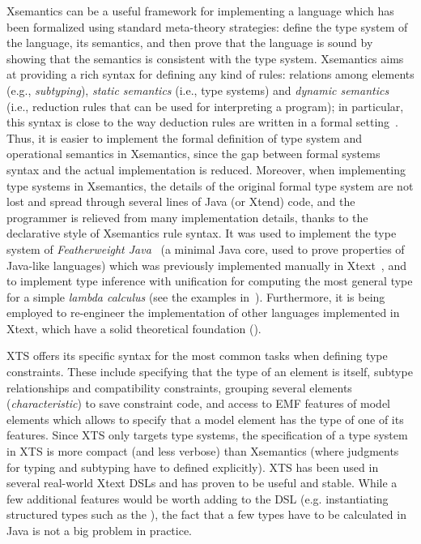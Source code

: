 Xsemantics can be a useful framework for implementing a language which has been
formalized using standard meta-theory strategies: define the type system of the
language, its semantics, and then prove that the language is sound by showing
that the semantics is consistent with the type system.
Xsemantics aims at providing a rich syntax for defining any kind of rules:
relations among elements (e.g., \emph{subtyping}), \emph{static semantics}
(i.e., type systems) and \emph{dynamic semantics} (i.e., reduction rules that
can be used for interpreting a program); in particular, this syntax is close to
the way deduction rules are written in a formal
setting~\cite{hindley:1997a,Pierce02}.  Thus, it is easier to implement the
formal definition of type system and operational semantics in Xsemantics, since
the gap between formal systems syntax and the actual implementation is reduced.
Moreover, when implementing type systems in Xsemantics, the details of the
original formal type system are not lost and spread through several lines of
Java (or Xtend) code, and the programmer is relieved from many implementation
details, thanks to the declarative style of Xsemantics rule syntax. It was used
to implement the type system of \emph{Featherweight
Java}~\cite{IgarashiPierceWadler:TOPLAS-2001} (a minimal Java core, used to
prove properties of Java-like languages) which was previously implemented
manually in Xtext~\cite{Bet10}, and to implement type inference with unification
for computing the most general type for a simple \emph{lambda calculus} (see the
examples in~\cite{lbts}).  Furthermore, it is being employed to re-engineer the
implementation of other languages implemented in Xtext, which have a solid
theoretical foundation (\cite{CompDelta,TraitRecordJ-SCP}).

XTS offers its specific syntax for the most common tasks when defining type
constraints. These include specifying that the type of an element is itself,
subtype relationships and compatibility constraints, grouping several elements
(\emph{characteristic}) to save constraint code, and access to EMF features of
model elements which allows to specify that a model element has the type of one
of its features.  Since XTS only targets type systems, the specification of a
type system in XTS is more compact (and less verbose) than Xsemantics (where
judgments for typing and subtyping have to defined explicitly).
XTS has been used in several real-world Xtext DSLs and has
proven to be useful and stable. While a few additional features would be worth
adding to the DSL (e.g. instantiating structured types such as the
), the fact that a few types have to be calculated in Java is not
a big problem in practice.

